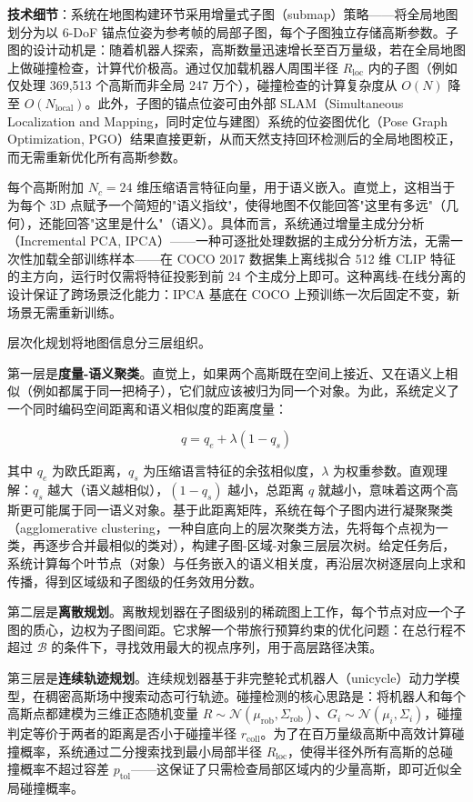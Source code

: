 \textbf{技术细节}：系统在地图构建环节采用增量式子图（submap）策略——将全局地图划分为以 6-DoF 锚点位姿为参考帧的局部子图，每个子图独立存储高斯参数。子图的设计动机是：随着机器人探索，高斯数量迅速增长至百万量级，若在全局地图上做碰撞检查，计算代价极高。通过仅加载机器人周围半径 $R_\text{loc}$ 内的子图（例如仅处理 369,513 个高斯而非全局 247 万个），碰撞检查的计算复杂度从 $O(N)$ 降至 $O(N_\text{local})$。此外，子图的锚点位姿可由外部 SLAM（Simultaneous Localization and Mapping，同时定位与建图）系统的位姿图优化（Pose Graph Optimization, PGO）结果直接更新，从而天然支持回环检测后的全局地图校正，而无需重新优化所有高斯参数。

每个高斯附加 $N_c=24$ 维压缩语言特征向量，用于语义嵌入。直觉上，这相当于为每个 3D 点赋予一个简短的"语义指纹"，使得地图不仅能回答"这里有多远"（几何），还能回答"这里是什么"（语义）。具体而言，系统通过增量主成分分析（Incremental PCA, IPCA）——一种可逐批处理数据的主成分分析方法，无需一次性加载全部训练样本——在 COCO 2017 数据集上离线拟合 512 维 CLIP 特征的主方向，运行时仅需将特征投影到前 24 个主成分上即可。这种离线-在线分离的设计保证了跨场景泛化能力：IPCA 基底在 COCO 上预训练一次后固定不变，新场景无需重新训练。

层次化规划将地图信息分三层组织。

第一层是\textbf{度量-语义聚类}。直觉上，如果两个高斯既在空间上接近、又在语义上相似（例如都属于同一把椅子），它们就应该被归为同一个对象。为此，系统定义了一个同时编码空间距离和语义相似度的距离度量：

\begin{equation}
q = q_e + \lambda(1 - q_s)
\end{equation}

其中 $q_e$ 为欧氏距离，$q_s$ 为压缩语言特征的余弦相似度，$\lambda$ 为权重参数。直观理解：$q_s$ 越大（语义越相似），$(1-q_s)$ 越小，总距离 $q$ 就越小，意味着这两个高斯更可能属于同一语义对象。基于此距离矩阵，系统在每个子图内进行凝聚聚类（agglomerative clustering，一种自底向上的层次聚类方法，先将每个点视为一类，再逐步合并最相似的类对），构建子图-区域-对象三层层次树。给定任务后，系统计算每个叶节点（对象）与任务嵌入的语义相关度，再沿层次树逐层向上求和传播，得到区域级和子图级的任务效用分数。

第二层是\textbf{离散规划}。离散规划器在子图级别的稀疏图上工作，每个节点对应一个子图的质心，边权为子图间距。它求解一个带旅行预算约束的优化问题：在总行程不超过 $\mathcal{B}$ 的条件下，寻找效用最大的视点序列，用于高层路径决策。

第三层是\textbf{连续轨迹规划}。连续规划器基于非完整轮式机器人（unicycle）动力学模型，在稠密高斯场中搜索动态可行轨迹。碰撞检测的核心思路是：将机器人和每个高斯点都建模为三维正态随机变量 $R \sim \mathcal{N}(\mu_\text{rob}, \Sigma_\text{rob})$、$G_i \sim \mathcal{N}(\mu_i, \Sigma_i)$，碰撞判定等价于两者的距离是否小于碰撞半径 $r_\text{coll}$。为了在百万量级高斯中高效计算碰撞概率，系统通过二分搜索找到最小局部半径 $R_\text{loc}$，使得半径外所有高斯的总碰撞概率不超过容差 $p_\text{tol}$——这保证了只需检查局部区域内的少量高斯，即可近似全局碰撞概率。

